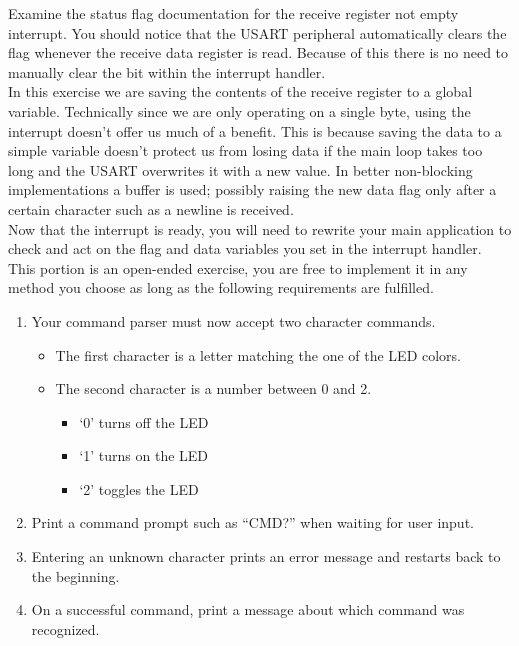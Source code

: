 \documentclass[openany,11pt,fleqn]{book} %
\begin{document}
Examine the status flag documentation for the receive register not empty interrupt. You should notice that the USART peripheral automatically clears the flag whenever the receive data register is read. Because of this there is no need to manually clear the bit within the interrupt handler. \\

In this exercise we are saving the contents of the receive register to a global variable. Technically since we are only operating on a single byte, using the interrupt doesn't offer us much of a benefit. This is because saving the data to a simple variable doesn't protect us from losing data if the main loop takes too long and the USART overwrites it with a new value. In better non-blocking implementations a buffer is used; possibly raising the new data flag only after a certain character such as a newline is received.\\

Now that the interrupt is ready, you will need to rewrite your main application to check and act on the flag and data variables you set in the interrupt handler. This portion is an open-ended exercise, you are free to implement it in any method you choose as long as the following requirements are fulfilled. 



\begin{enumerate}
    \item Your command parser must now accept two character commands.
    \begin{itemize}
        \item The first character is a letter matching the one of the LED colors.
        \item The second character is a number between 0 and 2. 
        \begin{itemize}
            \item `0' turns off the LED
            \item `1' turns on the LED
            \item `2' toggles the LED
        \end{itemize}
    \end{itemize}
    \item Print a command prompt such as ``CMD?'' when waiting for user input.
    \item Entering an unknown character prints an error message and restarts back to the beginning.
    \item On a successful command, print a message about which command was recognized. 
\end{enumerate}
\end{document}
